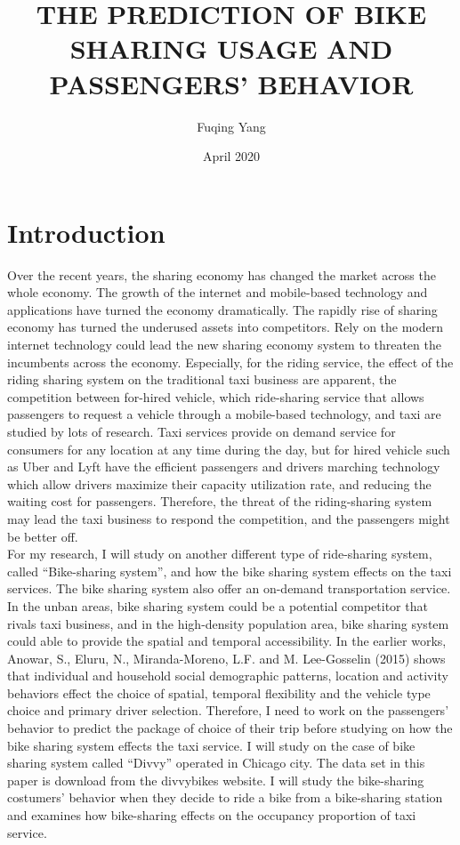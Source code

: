 \documentclass{article}
\title{THE PREDICTION OF BIKE SHARING USAGE AND PASSENGERS’ BEHAVIOR}
\author{Fuqing Yang}
\date{April 2020}
\begin{document}
\maketitle

\doublespace

    \section{Introduction}
    Over the recent years, the sharing economy has changed the market across the whole economy. The growth of the internet and mobile-based technology and applications have turned the economy dramatically.  The rapidly rise of sharing economy has turned the underused assets into competitors. Rely on the modern internet technology could lead the new sharing economy system to threaten the incumbents across the economy. Especially, for the riding service, the effect of the riding sharing system on the traditional taxi business are apparent, the competition between for-hired vehicle, which ride-sharing service that allows passengers to request a vehicle through a mobile-based technology, and taxi are studied by lots of research. Taxi services provide on demand service for consumers for any location at any time during the day, but for hired vehicle such as Uber and Lyft have the efficient passengers and drivers marching technology which allow drivers maximize their capacity utilization rate, and reducing the waiting cost for passengers. Therefore, the threat of the riding-sharing system may lead the taxi business to respond the competition, and the passengers might be better off. \\
    For my research, I will study on another different type of ride-sharing system, called “Bike-sharing system”, and how the bike sharing system effects on the taxi services. The bike sharing system also offer an on-demand transportation service. In the unban areas, bike sharing system could be a potential competitor that rivals taxi business, and in the high-density population area, bike sharing system could able to provide the spatial and temporal accessibility. In the earlier works, Anowar, S., Eluru, N., Miranda-Moreno, L.F. and M. Lee-Gosselin (2015)\citep{anowar2015joint} shows that individual and household social demographic patterns, location and activity behaviors effect the choice of spatial, temporal flexibility and the vehicle type choice and primary driver selection. Therefore, I need to work on the passengers’ behavior to predict the package of choice of their trip before studying on how the bike sharing system effects the taxi service. I will study on the case of bike sharing system called “Divvy” operated in Chicago city. The data set in this paper is download from the divvybikes website. I will study the bike-sharing costumers’ behavior when they decide to ride a bike from a bike-sharing station and examines how bike-sharing effects on the occupancy proportion of taxi service.\\
\end{document}
